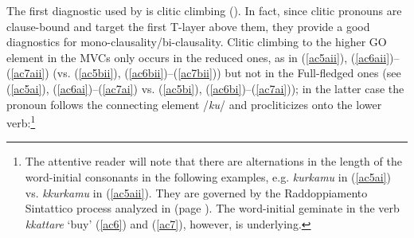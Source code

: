 \documentclass[output=paper]{langscibook}
\begin{document}
The first diagnostic used by \citet{cardinaletti2003a} is clitic climbing (\citealt{rizzi1976a}). In fact, since clitic pronouns are clause-bound and target the first T-layer above them, they provide a good diagnostics for mono-clausality/bi-clausality. Clitic climbing to the higher GO element in the MVCs only occurs in the reduced ones, as in (\ref{ac5aii}), (\ref{ac6aii})--(\ref{ac7aii}) (vs. (\ref{ac5bii}), (\ref{ac6bii})--(\ref{ac7bii})) but not in the Full-fledged ones (see (\ref{ac5ai}), (\ref{ac6ai})--(\ref{ac7ai}) vs. (\ref{ac5bi}), (\ref{ac6bi})--(\ref{ac7ai})); in the latter case the pronoun follows the connecting element /\textit{ku}/ and procliticizes onto the lower verb:\footnote{The attentive reader will note that there are alternations in the length of the word-initial consonants in the following examples, e.g. \textit{kurkamu} in (\ref{ac5ai}) vs. \textit{kkurkamu} in (\ref{ac5aii}).  They are governed by the Raddoppiamento Sintattico process analyzed in  (page \pageref{ac26}).  The word-initial geminate in the verb \textit{kkattare} ‘buy’ (\ref{ac6}) and (\ref{ac7}), however, is underlying.}
\end{document}
